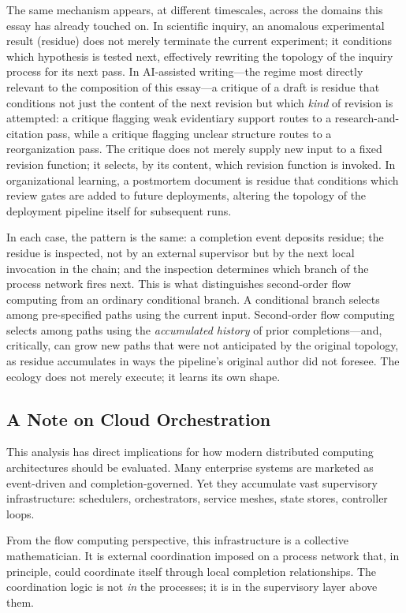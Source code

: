 \documentclass[12pt, a4paper]{article}
\begin{document}
The same mechanism appears, at different timescales, across the
domains this essay has already touched on. In scientific inquiry,
an anomalous experimental result (residue) does not merely
terminate the current experiment; it conditions which hypothesis
is tested next, effectively rewriting the topology of the inquiry
process for its next pass. In AI-assisted writing---the regime
most directly relevant to the composition of this essay---a
critique of a draft is residue that conditions not just the
content of the next revision but which \emph{kind} of revision is
attempted: a critique flagging weak evidentiary support routes to
a research-and-citation pass, while a critique flagging unclear
structure routes to a reorganization pass. The critique does not
merely supply new input to a fixed revision function; it selects,
by its content, which revision function is invoked. In
organizational learning, a postmortem document is residue that
conditions which review gates are added to future deployments,
altering the topology of the deployment pipeline itself for
subsequent runs.

In each case, the pattern is the same: a completion event deposits
residue; the residue is inspected, not by an external supervisor
but by the next local invocation in the chain; and the inspection
determines which branch of the process network fires next. This is
what distinguishes second-order flow computing from an ordinary
conditional branch. A conditional branch selects among
pre-specified paths using the current input. Second-order flow
computing selects among paths using the \emph{accumulated history}
of prior completions---and, critically, can grow new paths that
were not anticipated by the original topology, as residue
accumulates in ways the pipeline's original author did not
foresee. The ecology does not merely execute; it learns its own
shape.

\subsection{A Note on Cloud Orchestration}

This analysis has direct implications for how modern distributed
computing architectures should be evaluated. Many enterprise systems
are marketed as event-driven and completion-governed. Yet they
accumulate vast supervisory infrastructure: schedulers,
orchestrators, service meshes, state stores, controller loops.

From the flow computing perspective, this infrastructure is a
collective mathematician. It is external coordination imposed on
a process network that, in principle, could coordinate itself
through local completion relationships. The coordination logic is
not \emph{in} the processes; it is in the supervisory layer above
them.
\end{document}
